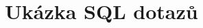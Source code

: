\documentclass[a4paper, 12pt]{article}
\begin{document}
\begin{comment}
Plošina uprostřed území je rozeznatelná zejména z tvarů vrstevnic. Z trojúhelníkové sítě je patrné, že je trochu vyvýšená, ale i tak to chce trochu představivosti.

\subsection{Hrana}
\begin{figure}[h!]
	\centering
	\texttt{[image: ./pictures/kupec\_edge\_contours.png]}
	\texttt{[image: ./pictures/kupec\_edge\_slope.png]}
	\caption{Hrana silnice vytvořená aplikací}
\end{figure}

\begin{figure}[h!]
	\centering
	\texttt{[image: ./pictures/atlas\_edge.png]}
	\caption{Hrana silnice ze SW \textit{Atlas}}
\end{figure}

Vygenerované vrstevnice v okolí silnice působí silně kostrbatým dojmem, avšak trojúhel\-ní\-ko\-vá síť poměrně věrně kopíruje tvar silnice. Jak již bylo zmíněno výše, velkým pro\-blé\-mem jsou štíhlé trojúhelníky v horní části modelu, které by neměly existovat.


\subsection{Údolnice}
\begin{figure}[h!]
	\centering
	\texttt{[image: ./pictures/kupec\_thalweg\_contours.png]}
	\texttt{[image: ./pictures/kupec\_thalweg\_aspect.png]}
	\caption{Údolnice vytvořená aplikací}
\end{figure}

\begin{figure}[h!]
	\centering
	\texttt{[image: ./pictures/atlas\_thalweg.png]}
	\caption{Údolnice ze SW \textit{Atlas}}
\end{figure}

Pro názornost porovnání byla tentokrát použita orientace trojúhelníků ke světovým stranám. Z jejich natočení je patrné, že ve středu dochází ke zlomu v terénu. Vrstevnice tento úkaz hezky vystihují. Ze všech částí DMT vystihla aplikace tento tvar v porovnání s DMT z \textit{Atlasu} nejvěrněji.
\clearpage

\end{comment}

\section{Ukázka SQL dotazů}
\end{document}
